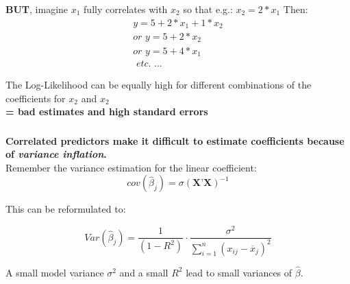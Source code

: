 \documentclass{beamer}
\newenvironment{VerbatimIN}
 {\VerbatimEnvironment
  \begin{tcolorbox}[
    breakable,
    colback=lightgray,
    spartan
  ]%
  \begin{Verbatim}}
 {\end{Verbatim}\end{tcolorbox}}
\newenvironment{VerbatimOUT}
 {\VerbatimEnvironment
  \begin{tcolorbox}[
    breakable,
    spartan
  ]%
  \begin{Verbatim}}
 {\end{Verbatim}\end{tcolorbox}}
\begin{document}
\begin{frame}
    \frametitle{}
    \textbf{BUT}, imagine $x_1$ fully correlates with $x_2$ so that e.g.: $x_2 = 2 * x_1$ Then:
    \begin{equation*}
        \begin{aligned}
        y = 5 + 2 * x_1 + 1 * x_2 \\
        \textit{or } y = 5 + 2 * x_2 \\
        \textit{or } y = 5 + 4 * x_1 \\
        \textit{ etc. ...}
        \end{aligned}
    \end{equation*}
    \vspace{0.5cm}
    
    The Log-Likelihood can be equally high for different combinations of the coefficients for $x_2$ and $x_2$\\
    \textbf{= bad estimates and high standard errors}
\end{frame}

\begin{frame}
  \frametitle{}
  \textbf{Correlated predictors make it difficult to estimate coefficients because of \textit{variance inflation}.}
  \\
  Remember the variance estimation for the linear coefficient:
  \begin{equation*}
      cov(\hat{\beta}_j) = \sigma(\textbf{X'X})^{-1}
  \end{equation*}

  This can be reformulated to:
  
  \begin{equation*}
    Var(\hat{\beta}_j) = \frac{1}{(1-R^2)} \cdot \frac{\sigma^2}{\sum_{i=1}^{n} (x_{ij} - \overline{x}_j)^2}
  \end{equation*}
  
  A small model variance $\sigma^2$ and a small $R^2$ lead to small variances of $\hat{\beta}$.
\end{frame}

\end{document}
